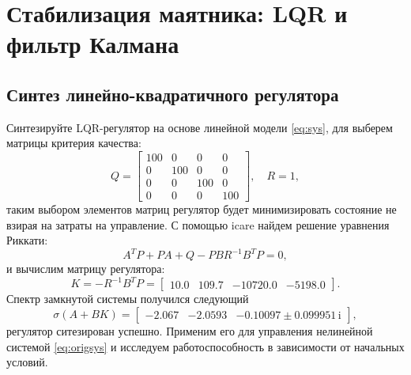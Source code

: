 \chapter{Стабилизация маятника: LQR и фильтр Калмана}

\section{Синтез линейно-квадратичного регулятора}

Синтезируйте LQR-регулятор на основе линейной модели \eqref{eq:sys},
для выберем матрицы критерия качества:
\begin{equation*}
    Q=\begin{bmatrix}
        100&0&0&0\\
        0&100&0&0\\
        0&0&100&0\\
        0&0&0&100
    \end{bmatrix},\quad
    R=1,
\end{equation*}
таким выбором элементов матриц регулятор будет минимизировать состояние
не взирая на затраты на управление.
С помощью icare найдем решение уравнения Риккати:
\begin{equation*}
    A^TP+PA+Q-PBR^{-1}B^TP=0,
\end{equation*}
и вычислим матрицу регулятора:
\begin{equation*}
    K=-R^{-1}B^TP=\begin{bmatrix}
10.0 & 109.7 & -10720.0 & -5198.0
    \end{bmatrix}.
\end{equation*}
Спектр замкнутой системы получился следующий
\begin{equation*}
    \sigma(A+BK)=\begin{bmatrix}
-2.067&
-2.0593&
-0.10097\pm0.099951\,\mathrm{i}
    \end{bmatrix},
\end{equation*}
регулятор ситезирован успешно.
Применим его для управления нелинейной системой \eqref{eq:origsys} и
исследуем работоспособность в зависимости от начальных условий.
